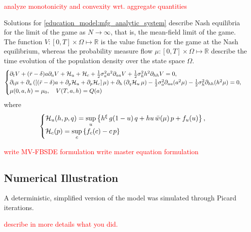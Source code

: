 \textcolor{red}{analyze monotonicity and convexity wrt. aggregate quantities}


Solutions for \eqref{education_model:mfg_analytic_system} describe Nash equilibria for the limit of the game as $N \to \infty$, that is, the mean-field limit of the game.
The function $V: [0,T] \times \Omega \mapsto \mathbb{R}$ is the value function for the game at the Nash equilibrium,
whereas the probability measure flow $\mu: [0,T] \times \Omega \mapsto \mathbb{R}$ describe the time evolution of the  population density over the state space $\Omega$.
\begin{equation}\label{education_model:mfg_analytic_system}
    \begin{cases}
        \partial_t V + (\bar r  - \delta) a \partial_a V + \mathcal{H}_u  + \mathcal{H}_c + \frac{1}{2} \sigma_a^2 a^2 \partial_{aa} V + \frac{1}{2} \sigma^2_h h^2 \partial_{hh} V = 0,\\
        \partial_t \mu + \partial_a \left( \left[ (\bar r - \delta) a + \partial_p \mathcal{H}_u + \partial_p \mathcal{H}_c \right] \mu \right)  + \partial_h \left( \partial_q \mathcal{H}_u\, \mu\right)  - \frac{1}{2} \sigma_a^2 \partial_{aa} (a^2\mu) - \frac{1}{2} \sigma^2_h \partial_{hh} (h^2\mu) = 0,\\
        \mu(0,a,h) = \mu_0,\quad V(T,a,h) = Q(a)
    \end{cases}
\end{equation}
where
\begin{equation}
    \begin{cases}
        \mathcal{H}_u(h,p,q) = \sup\limits_{u} \left \{ h^\xi \, g(1 - u)\, q + h u \, \bar w (\mu)\, p + f_u(u)\right\},\\
        \mathcal{H}_c(p) = \sup\limits_{c} \left \{  f_c(c) - c \, p \right \}
    \end{cases}
\end{equation}

\textcolor{red}{write MV-FBSDE formulation}
\textcolor{red}{write master equation formulation}

\subsection{Numerical Illustration}
        A deterministic, simplified version of the model was simulated through Picard iterations.
        
        \textcolor{red}{describe in more details what you did.}
        
